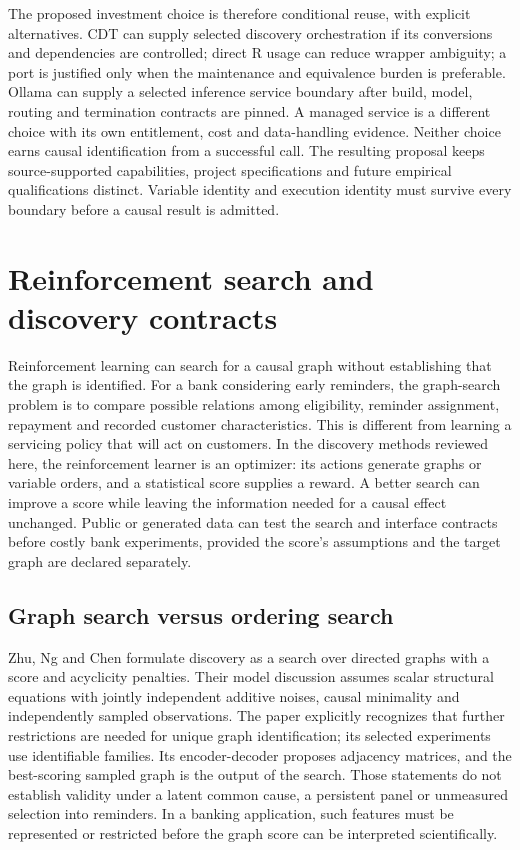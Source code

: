 The proposed investment choice is therefore conditional reuse, with explicit alternatives.
CDT can supply selected discovery orchestration if its conversions and dependencies are controlled;
direct R usage can reduce wrapper ambiguity; a port is justified only when the maintenance and
equivalence burden is preferable. Ollama can supply a selected inference service boundary after
build, model, routing and termination contracts are pinned. A managed service is a different
choice with its own entitlement, cost and data-handling evidence. Neither choice earns causal
identification from a successful call. The resulting proposal keeps source-supported capabilities,
project specifications and future empirical qualifications distinct.
Variable identity and execution identity must survive every boundary before a causal result is admitted.


\section[Reinforcement search and discovery contracts]{Reinforcement search and discovery contracts}
\label{sec:exec28-rl}
Reinforcement learning can search for a causal graph without establishing that the graph is identified.
For a bank considering early reminders, the graph-search problem is to compare possible relations
among eligibility, reminder assignment, repayment and recorded customer characteristics. This is
different from learning a servicing policy that will act on customers. In the discovery methods
reviewed here, the reinforcement learner is an optimizer: its actions generate graphs or variable
orders, and a statistical score supplies a reward. A better search can improve a score while
leaving the information needed for a causal effect unchanged. Public or generated data can test
the search and interface contracts before costly bank experiments, provided the score's assumptions
and the target graph are declared separately.~\citep{exec28_rl_zhu,exec28_rl_wang}

\subsection{Graph search versus ordering search}
Zhu, Ng and Chen formulate discovery as a search over directed graphs with a score and acyclicity
penalties. Their model discussion assumes scalar structural equations with jointly independent
additive noises, causal minimality and independently sampled observations. The paper explicitly
recognizes that further restrictions are needed for unique graph identification; its selected
experiments use identifiable families. Its encoder-decoder proposes adjacency matrices, and the
best-scoring sampled graph is the output of the search. Those statements do not establish validity
under a latent common cause, a persistent panel or unmeasured selection into reminders. In a
banking application, such features must be represented or restricted before the graph score can
be interpreted scientifically.~\citep{exec28_rl_zhu}

